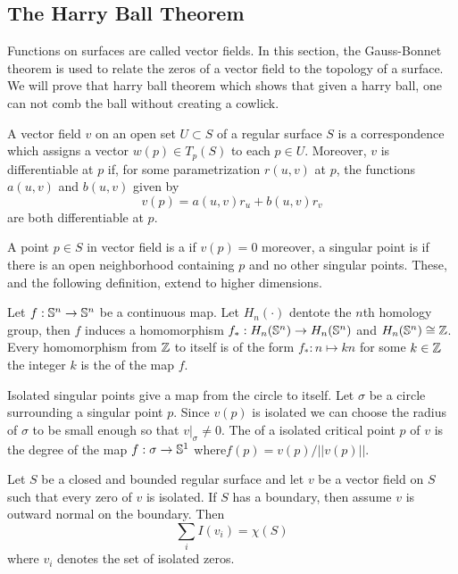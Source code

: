 \subsection{The Harry Ball Theorem}
\label{sec:harry-ball}

Functions on surfaces are called vector fields.
In this section, the Gauss-Bonnet theorem is used
to relate the zeros of a vector field to the topology of a surface.
We will prove that harry ball theorem which shows that 
given a harry ball, one
can not comb the ball without creating a cowlick.




\begin{definition}\label{def:vector-field}
	A vector field $v$  on an open set $U\subset S$ of a regular surface $S$
	is a correspondence which assigns a vector $w(p)\in T_p(S)$ to each $p\in U$.
	Moreover, $v$ is differentiable at $p$ if, for some parametrization $r(u,v)$ at $p$,
	the functions $a(u,v)$ and $b(u,v)$ given by
		$$v(p)=a(u,v)r_u + b(u,v)r_v$$
	are both differentiable at $p$.
\end{definition}

A point $p\in S$ in vector field is a  if $v(p)=0$
moreover, a singular point is  if there is an open neighborhood
containing $p$ and no other singular points. These, and the following definition,
extend to higher dimensions.

Let $f:\mathbb{S}^n\to \mathbb{S}^n$ be a continuous map. Let $H_n(\cdot)$ dentote  
the $n$th  homology group, then $f$ induces a homomorphism
$f_*:H_n(\mathbb{S}^n)\to  H_n(\mathbb{S}^n)$ and  $H_n(\mathbb{S}^n)\cong \mathbb{Z}$.
 Every homomorphism from $\mathbb{Z}$ to itself is of the form $f_*:n\mapsto kn$ for some 
$k\in \mathbb{Z}$ the integer $k$ is the  of the map $f$.

Isolated singular points give a map from the circle to itself.
Let $\sigma$ be a circle surrounding a singular point $p$.
Since $v(p)$ is isolated we can choose the radius of $\sigma$ to be 
small enough so that $v|_\sigma\neq 0$. 
The  of a isolated critical point $p$ of $v$ is the degree
of the map $f:\sigma\to \mathbb{S}^1$ where$f(p)=v(p)/||v(p)||$.





\begin{theorem}\label{thm:poincare-hopf}
	Let $S$ be a closed and bounded regular surface and let $v$ be a vector field
	on $S$ such that every zero of $v$ is isolated. If $S$ has a boundary, 
	then assume $v$ is outward normal on the boundary. Then
	$$\sum_iI(v_i)=\chi(S)$$
	where $v_i$ denotes the set of isolated zeros.
	
\end{theorem}

